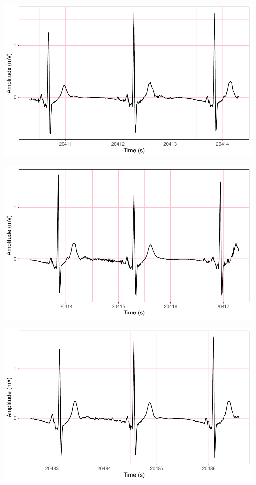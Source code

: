 \documentclass[
]{article}
\begin{document}
\begin{center}\includegraphics{report_files/figure-latex/abnormal-interval-42} \end{center}

\begin{center}\includegraphics{report_files/figure-latex/abnormal-interval-43} \end{center}

\begin{center}\includegraphics{report_files/figure-latex/abnormal-interval-44} \end{center}
\end{document}
